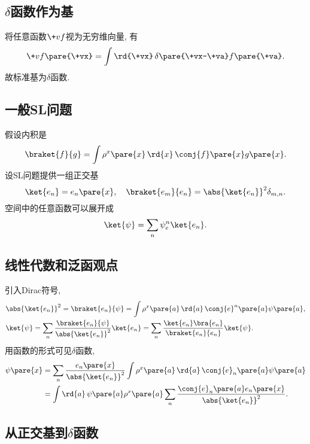 \documentclass[hidelinks]{ctexart}
\begin{document}

\subsection{\texorpdfstring{$\delta$}{delta}函数作为基} %
\label{sub:texorpdfstring_delta函数作为基}

将任意函数$\+vf$视为无穷维向量, 有
\[ \+vf\pare{\+vx} = \int \rd{\+vx}\, \delta\pare{\+vx-\+va}f\pare{\+va}. \]
故标准基为$\delta$函数.


\subsection{一般SL问题} %
\label{sub:一般sl问题}

\newpoint{}假设内积是
\[ \braket{f}{g} = \int \rho^{x}\pare{x}\,\rd{x}\, \conj{f}\pare{x}g\pare{x}. \]
\newpoint{}设SL问题提供一组正交基
\[ \ket{e_n} = e_n\pare{x},\quad \braket{e_m}{e_n} = \abs{\ket{e_n}}^2 \delta_{m,n}. \]
\newpoint{}空间中的任意函数可以展开成
\[ \ket{\psi} = \sum_n \psi_e^n \ket{e_n}. \]


\subsection{线性代数和泛函观点} %
\label{sub:线性代数和泛函观点}

\newpoint{}引入Dirac符号,
\begin{align*}
    & \abs{\ket{e_n}}^2 = \braket{e_n}{\psi} = \int \rho^x\pare{a}\,\rd{a}\, \conj{e}^n\pare{a}\psi\pare{a}, \\
    & \ket{\psi} = \sum_n \frac{\braket{e_n}{\psi}}{\abs{\ket{e_n}}^2} \ket{e_n} = \sum_n \frac{\ket{e_n}\bra{e_n}}{\braket{e_n}{e_n}}\ket{\psi}.
\end{align*}
\newpoint{}用函数的形式可见$\delta$函数,
\begin{align*}
    \psi\pare{x} &= \sum_n \frac{e_n\pare{x}}{\abs{\ket{e_n}}^2} \int \rho^x \pare{a}\,\rd{a}\, \conj{e}_n\pare{a}\psi\pare{a} \\
    &= \int \rd{a}\,\psi\pare{a}\rho^x\pare{a} \sum_n \frac{\conj{e}_n\pare{a}e_n\pare{x}}{\abs{\ket{e_n}}^2}.
\end{align*}


\subsection{从正交基到\texorpdfstring{$\delta$}{delta}函数} %
\label{sub:从正交基到函数}
\end{document}
